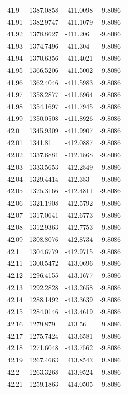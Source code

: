 \begin{table}[H]
\begin{tabular}{llll}
41.9 & 1387.0858 & -411.0098 & -9.8086 \\
41.91 & 1382.9747 & -411.1079 & -9.8086 \\
41.92 & 1378.8627 & -411.206 & -9.8086 \\
41.93 & 1374.7496 & -411.304 & -9.8086 \\
41.94 & 1370.6356 & -411.4021 & -9.8086 \\
41.95 & 1366.5206 & -411.5002 & -9.8086 \\
41.96 & 1362.4046 & -411.5983 & -9.8086 \\
41.97 & 1358.2877 & -411.6964 & -9.8086 \\
41.98 & 1354.1697 & -411.7945 & -9.8086 \\
41.99 & 1350.0508 & -411.8926 & -9.8086 \\
42.0 & 1345.9309 & -411.9907 & -9.8086 \\
42.01 & 1341.81 & -412.0887 & -9.8086 \\
42.02 & 1337.6881 & -412.1868 & -9.8086 \\
42.03 & 1333.5653 & -412.2849 & -9.8086 \\
42.04 & 1329.4414 & -412.383 & -9.8086 \\
42.05 & 1325.3166 & -412.4811 & -9.8086 \\
42.06 & 1321.1908 & -412.5792 & -9.8086 \\
42.07 & 1317.0641 & -412.6773 & -9.8086 \\
42.08 & 1312.9363 & -412.7753 & -9.8086 \\
42.09 & 1308.8076 & -412.8734 & -9.8086 \\
42.1 & 1304.6779 & -412.9715 & -9.8086 \\
42.11 & 1300.5472 & -413.0696 & -9.8086 \\
42.12 & 1296.4155 & -413.1677 & -9.8086 \\
42.13 & 1292.2828 & -413.2658 & -9.8086 \\
42.14 & 1288.1492 & -413.3639 & -9.8086 \\
42.15 & 1284.0146 & -413.4619 & -9.8086 \\
42.16 & 1279.879 & -413.56 & -9.8086 \\
42.17 & 1275.7424 & -413.6581 & -9.8086 \\
42.18 & 1271.6048 & -413.7562 & -9.8086 \\
42.19 & 1267.4663 & -413.8543 & -9.8086 \\
42.2 & 1263.3268 & -413.9524 & -9.8086 \\
42.21 & 1259.1863 & -414.0505 & -9.8086 \\

\end{tabular}
\end{table}
